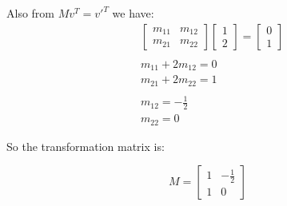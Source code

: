 \documentclass{ximera}
\begin{document}
\begin{question}
Also from  $M v^T = v'^T$ we have:
\begin{align*}
&\begin{bmatrix}
m_{11} & m_{12} \\
m_{21} & m_{22}
\end{bmatrix}
\begin{bmatrix}
1 \\
2
\end{bmatrix}
= 
\begin{bmatrix}
0 \\
1
\end{bmatrix} \\
\\
& m_{11} + 2 m_{12} = 0 \\
& m_{21} + 2 m_{22} = 1 \\
\\
&m_{12} = - \frac{1}{2} \\
&m_{22} = 0
\end{align*}

So the transformation matrix is:
\begin{center}
\begin{equation*}
M =
\begin{bmatrix}
1 & -\frac{1}{2} \\
1 & 0
\end{bmatrix}
\end{equation*}
\end{center}


\end{question}
\end{document}

